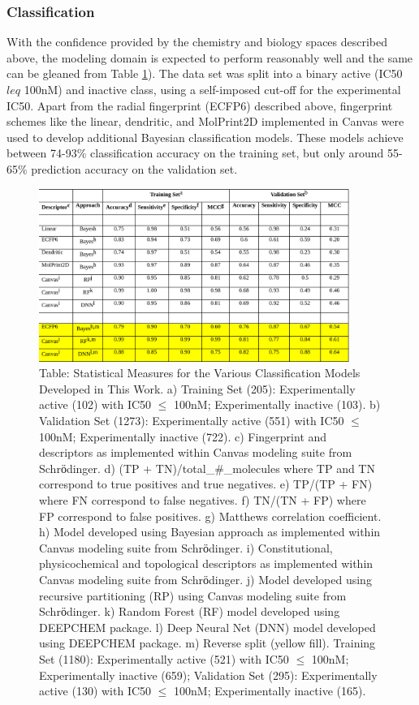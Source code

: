 \subsubsection{Classification}

With the confidence provided by the chemistry and biology spaces described above, the modeling domain is expected to perform reasonably well and the same can be gleaned from Table \ref{fig:bace_table1}).  The data set was split into a binary active (IC50 $leq$ 100nM) and inactive class, using a self-imposed cut-off for the experimental IC50.  Apart from the radial fingerprint (ECFP6) described above, fingerprint schemes like the linear, dendritic, and MolPrint2D implemented in Canvas were used to develop additional Bayesian classification models.  These models achieve between 74-93\% classification accuracy on the training set, but only around 55-65\% prediction accuracy on the validation set.  

\begin{figure}
  \centering
  \includegraphics[width=0.9\textwidth]{Images/bace_table_1.png}
  \caption{Table: Statistical Measures for the Various Classification Models Developed in This Work. a) Training Set (205):  Experimentally active (102) with IC50 $\leq$ 100nM; Experimentally inactive (103). b) Validation Set (1273):  Experimentally active (551) with IC50 $\leq$  100nM; Experimentally inactive (722). c) Fingerprint and descriptors as implemented within Canvas modeling suite from Schrӧdinger. d) (TP + TN)/total\_\#\_molecules where TP and TN correspond to true positives and true negatives. e) TP/(TP + FN) where FN correspond to false negatives. f) TN/(TN + FP) where FP correspond to false positives. g) Matthews correlation coefficient. h) Model developed using Bayesian approach as implemented within Canvas modeling suite from Schrӧdinger. i) Constitutional, physicochemical and topological descriptors as implemented within Canvas modeling suite from Schrӧdinger. j) Model developed using recursive partitioning (RP) using Canvas modeling suite from Schrӧdinger. k) Random Forest (RF) model developed using DEEPCHEM package. l) Deep Neural Net (DNN) model developed using DEEPCHEM package. m) Reverse split (yellow fill).  Training Set (1180):  Experimentally active (521) with IC50 $\leq$ 100nM; Experimentally inactive (659); Validation Set (295):  Experimentally active (130) with IC50 $\leq$ 100nM; Experimentally inactive (165).}
  \label{fig:bace_table1}
\end{figure}


